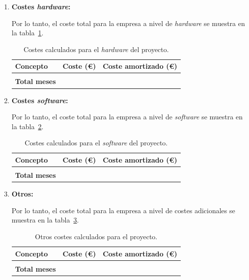 \begin{enumerate}
\item\textbf{Costes \textit{hardware}:}

Por lo tanto, el coste total para la empresa a nivel de \textit{hardware} se muestra en la tabla~\ref{a:costes-hardware}.

\begin{table}[p]
	\centering
	\begin{tabular}{l r r}
		\toprule
		\textbf{Concepto} & \textbf{Coste (€)} & \textbf{Coste amortizado (€)} \\
		\midrule
		 &  & \\
		\midrule
		\textbf{Total meses} & & \\
		\bottomrule
	\end{tabular}
	\caption[Costes: \textit{hardware}]{Costes calculados para el \textit{hardware} del proyecto.}
	\label{a:costes-hardware}
\end{table}

\item\textbf{Costes \textit{software}:}

Por lo tanto, el coste total para la empresa a nivel de \textit{software} se muestra en la tabla~\ref{a:costes-software}.

\begin{table}[p]
	\centering
	\begin{tabular}{l r r}
		\toprule
		\textbf{Concepto} & \textbf{Coste (€)} & \textbf{Coste amortizado (€)} \\
		\midrule
		&  & \\
		\midrule
		\textbf{Total meses} & & \\
		\bottomrule
	\end{tabular}
	\caption[Costes: \textit{software}]{Costes calculados para el \textit{software} del proyecto.}
	\label{a:costes-software}
\end{table}


\item\textbf{Otros:}

Por lo tanto, el coste total para la empresa a nivel de costes adicionales se muestra en la tabla~\ref{a:costes-otros}.

\begin{table}[p]
	\centering
	\begin{tabular}{l r r}
		\toprule
		\textbf{Concepto} & \textbf{Coste (€)} & \textbf{Coste amortizado (€)} \\
		\midrule
		&  & \\
		\midrule
		\textbf{Total meses} & & \\
		\bottomrule
	\end{tabular}
	\caption[Costes: otros]{Otros costes calculados para el proyecto.}
	\label{a:costes-otros}
\end{table}



\end{enumerate}
